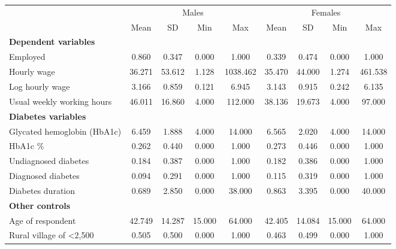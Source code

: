 \begin{table}[h!]
\begin{center}
{ \def\sym#1{\ifmmode^{#1}\else\(^{#1}\)\fi} \begin{tabular}{l*{2}{cccc}}
\toprule
                    &\multicolumn{4}{c}{Males}                          &\multicolumn{4}{c}{Females}                        \\
                    &        Mean&          SD&         Min&         Max&        Mean&          SD&         Min&         Max\\
\midrule
\textbf{Dependent variables} &&&&&&&& \\
Employed            &       0.860&       0.347&       0.000&       1.000&       0.339&       0.474&       0.000&       1.000\\
Hourly wage            &      36.271&      53.612&       1.128&    1038.462&      35.470&      44.000&       1.274&     461.538\\
Log hourly wage     &       3.166&       0.859&       0.121&       6.945&       3.143&       0.915&       0.242&       6.135\\
Usual weekly working hours&      46.011&      16.860&       4.000&     112.000&      38.136&      19.673&       4.000&      97.000\\
\textbf{Diabetes variables} &&&&&&&& \\
Glycated hemoglobin (HbA1c)&       6.459&       1.888&       4.000&      14.000&       6.565&       2.020&       4.000&      14.000\\
HbA1c \geq 6.5\%        &       0.262&       0.440&       0.000&       1.000&       0.273&       0.446&       0.000&       1.000\\
Undiagnosed diabetes&       0.184&       0.387&       0.000&       1.000&       0.182&       0.386&       0.000&       1.000\\
Diagnosed diabetes  &       0.094&       0.291&       0.000&       1.000&       0.115&       0.319&       0.000&       1.000\\
Diabetes duration   &       0.689&       2.850&       0.000&      38.000&       0.863&       3.395&       0.000&      40.000\\
\textbf{Other controls} &&&&&&&& \\
Age of respondent   &      42.749&      14.287&      15.000&      64.000&      42.405&      14.084&      15.000&      64.000\\
Rural village of <2,500&       0.505&       0.500&       0.000&       1.000&       0.463&       0.499&       0.000&       1.000\\

\end{tabular}}
\end{center}
\end{table}
